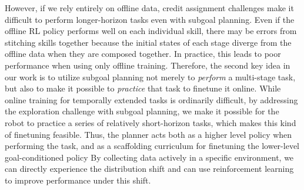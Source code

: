 However, if we rely entirely on offline data, credit assignment challenges make it difficult to perform longer-horizon tasks even with subgoal planning. Even if the offline RL policy performs well on each individual skill, there may be errors from stitching skills together because the initial states of each stage diverge from the offline data when they are composed together. In practice, this leads to poor performance when using only offline training. Therefore, the second key idea in our work is to utilize subgoal planning not merely to \emph{perform} a multi-stage task, but also to make it possible to \emph{practice} that task to finetune it online. While online training for temporally extended tasks is ordinarily difficult, by addressing the exploration challenge with subgoal planning, we make it possible for the robot to practice a series of relatively short-horizon tasks, which makes this kind of finetuning feasible. Thus, the planner acts both as a higher level policy when performing the task, and as a scaffolding curriculum for finetuning the lower-level goal-conditioned policy
By collecting data actively in a specific environment, we can directly experience the distribution shift and can use reinforcement learning to improve performance under this shift.

